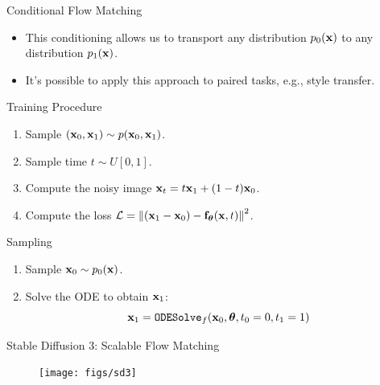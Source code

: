 \documentclass{beamer}
\begin{document}
\begin{frame}{Conditional Flow Matching}
	\begin{itemize}
		\item This conditioning allows us to transport any distribution $p_0(\mathbf{x})$ to any distribution $p_1(\mathbf{x})$.
		\item It's possible to apply this approach to paired tasks, e.g., style transfer.
	\end{itemize}
	\eqpause
	\begin{block}{Training Procedure}
		\begin{enumerate}
			\item Sample $(\mathbf{x}_0, \mathbf{x}_1) \sim p(\mathbf{x}_0, \mathbf{x}_1)$.
			\item Sample time $t \sim U[0, 1]$.
			\item Compute the noisy image $\mathbf{x}_t = t \mathbf{x}_1 + (1 - t) \mathbf{x}_0$.
			\item Compute the loss $ \mathcal{L} = \left\| (\mathbf{x}_1 - \mathbf{x}_0) - \mathbf{f}_{\boldsymbol{\theta}}(\mathbf{x}, t) \right\|^2 $.
		\end{enumerate}
	\end{block}
	\eqpause
	\vspace{-0.3cm}
	\begin{block}{Sampling}
		\begin{enumerate}
			\item Sample $\mathbf{x}_0 \sim p_0(\mathbf{x})$.
							\item Solve the ODE to obtain $\mathbf{x}_1$:
			\[
				\mathbf{x}_1 = \texttt{ODESolve}_f(\mathbf{x}_0, \boldsymbol{\theta}, t_0=0, t_1=1)
			\]
		\end{enumerate}
	\end{block}
\end{frame}
\begin{frame}{Stable Diffusion 3: Scalable Flow Matching}
	\begin{figure}
		\centering
		\texttt{[image: figs/sd3]}
	\end{figure}
\end{frame}
\end{document}
